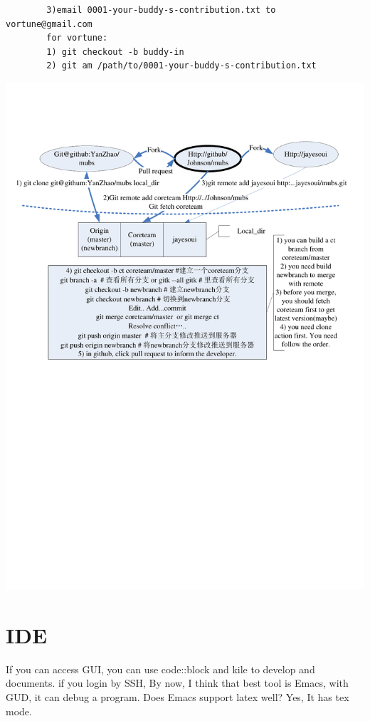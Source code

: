 \documentclass[a4paper,12pt,twoside]{book}
\begin{document}
\begin{itemize}
\begin{itemize}
\begin{itemize}
\begin{verbatim}
		3)email 0001-your-buddy-s-contribution.txt to vortune@gmail.com
		for vortune:
		1) git checkout -b buddy-in
		2) git am /path/to/0001-your-buddy-s-contribution.txt
		\end{verbatim}
	\end{itemize}

    \includegraphics[scale=0.7]{pics/Visio-git_cooperate}



\section{IDE}
If you can access GUI, you can use code::block and kile to develop and documents. if
you login by SSH, By now, I think that best tool is Emacs, with GUD, it can debug a
program. Does Emacs support latex well? Yes, It has tex mode. \par


\end{itemize}
\end{itemize}
\end{document}
